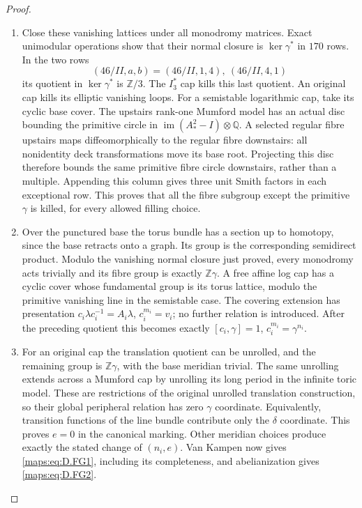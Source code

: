 \begin{proof}
\begin{enumerate}[label=\arabic*.,leftmargin=*]
\item Close these vanishing lattices under all monodromy matrices. Exact
unimodular operations show that their normal closure is
$\ker\gamma^*$ in $170$ rows. In the two rows
\[
 (46/II,a,b)=(46/II,1,4),\ (46/II,4,1)
\]
its quotient in $\ker\gamma^*$ is $\mathbb Z/3$. The $I_3^*$ cap
kills this last quotient. An original cap kills its elliptic vanishing
loops. For a semistable logarithmic cap, take its cyclic base cover.
The upstairs rank-one Mumford model has an actual disc bounding the
primitive circle in $\operatorname{im}(A_*^2-I)\otimes\mathbb Q$.
A selected regular fibre upstairs maps diffeomorphically to the
regular fibre downstairs: all nonidentity deck transformations move
its base root. Projecting this disc therefore bounds the same primitive
fibre circle downstairs, rather than a multiple. Appending this column
gives three unit Smith factors in each exceptional row. This proves
that all the fibre subgroup except the primitive $\gamma$ is killed,
for every allowed filling choice.

\item Over the punctured base the torus bundle has a section up to homotopy,
since the base retracts onto a graph. Its group is the corresponding
semidirect product. Modulo the vanishing normal closure just proved,
every monodromy acts trivially and its fibre group is exactly
$\mathbb Z\gamma$. A free affine log cap has a cyclic cover whose
fundamental group is its torus lattice, modulo the primitive vanishing
line in the semistable case. The covering extension has presentation
$c_i\lambda c_i^{-1}=A_i\lambda$, $c_i^{m_i}=v_i$; no further relation
is introduced. After the preceding quotient this becomes exactly
$[c_i,\gamma]=1$, $c_i^{m_i}=\gamma^{n_i}$.

\item For an original cap the translation quotient can be unrolled, and the
remaining group is $\mathbb Z\gamma$, with the base meridian trivial.
The same unrolling extends across a Mumford cap by unrolling its long
period in the infinite toric model. These are restrictions of the
original unrolled translation construction, so their global peripheral
relation has zero $\gamma$ coordinate. Equivalently, transition
functions of the line bundle contribute only the $\delta$ coordinate.
This proves $e=0$ in the canonical marking. Other meridian choices
produce exactly the stated change of $(n_i,e)$. Van Kampen now gives
\eqref{maps:eq:D.FG1}, including its completeness, and abelianization gives \eqref{maps:eq:D.FG2}.


\end{enumerate}
\end{proof}
